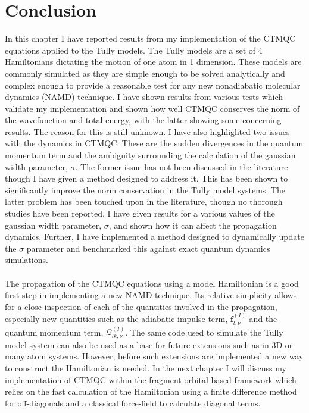 \section{Conclusion}
In this chapter I have reported results from my implementation of the CTMQC equations applied to the Tully models. The Tully models are a set of 4 Hamiltonians dictating the motion of one atom in 1 dimension. These models are commonly simulated as they are simple enough to be solved analytically and complex enough to provide a reasonable test for any new nonadiabatic molecular dynamics (NAMD) technique. I have shown results from various tests which validate my implementation and shown how well CTMQC conserves the norm of the wavefunction and total energy, with the latter showing some concerning results. The reason for this is still unknown. I have also highlighted two issues with the dynamics in CTMQC. These are the sudden divergences in the quantum momentum term and the ambiguity surrounding the calculation of the gaussian width parameter, $\sigma$. The former issue has not been discussed in the literature  though I have given a method designed to address it. This has been shown to significantly improve the norm conservation in the Tully model systems. The latter problem has been touched upon in the literature, though no thorough studies have been reported. I have given results for a various values of the gaussian width parameter, $\sigma$, and shown how it can affect the propagation dynamics. Further, I have implemented a method designed to dynamically update the $\sigma$ parameter and benchmarked this against exact quantum dynamics simulations.
\\\\
The propagation of the CTMQC equations using a model Hamiltonian is a good first step in implementing a new NAMD technique. Its relative simplicity allows for a close inspection of each of the quantities involved in the propagation, especially new quantities such as the   adiabatic impulse  term, $\mathbf{f}_{l, \nu}^{(I)}$ and the quantum momentum term, $\mathcal{Q}_{lk, \nu}^{(I)}$. The same code used to simulate the Tully model system can also be used as a base for future extensions such as in 3D or many atom systems. However, before such extensions are implemented a new way to construct the Hamiltonian is needed. In the next chapter I will discuss my implementation of CTMQC within the fragment orbital based framework which relies on the fast calculation of the Hamiltonian using a finite difference method for off-diagonals and a classical force-field to calculate diagonal terms. 



